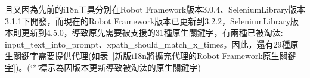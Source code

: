 \renewcommand\arraystretch{0.8}
\begin{table}[H]
    \centering
    \caption{第一版i18n已提供代理的Robot Framework原生關鍵字}
    \label{第一版i18n已提供的原生關鍵字}
\end{table}

且又因為先前的i18n工具分別在Robot Framework版本3.0.4、SeleniumLibrary版本3.1.1下開發，而現在的Robot Framework版本已更新到3.2.2，SeleniumLibrary版本則更新到4.5.0，導致原先需要被支援的31種原生關鍵字，有兩種已被淘汰:
input\_text\_into\_prompt、xpath\_should\_match\_x\_times。因此，還有29種原生關鍵字需要提供代理(如表~\ref{新版i18n將擴充代理的Robot Framework原生關鍵字})。(‘*’標示為因版本更新導致被淘汰的原生關鍵字)

